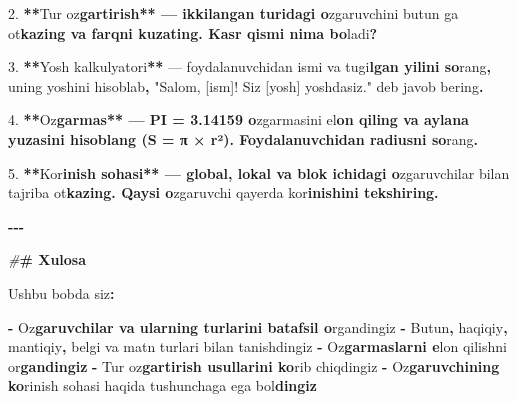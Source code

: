 \documentclass[a4paper,11pt,twoside,openright]{book}
\newenvironment{Shaded}{\begin{snugshade}}{\end{snugshade}}
\newcommand{\CharTok}[1]{\textcolor[rgb]{0.31,0.60,0.02}{#1}}
\newcommand{\ErrorTok}[1]{\textcolor[rgb]{0.64,0.00,0.00}{\textbf{#1}}}
\newcommand{\FloatTok}[1]{\textcolor[rgb]{0.00,0.00,0.81}{#1}}
\newcommand{\NormalTok}[1]{#1}
\newcommand{\OperatorTok}[1]{\textcolor[rgb]{0.81,0.36,0.00}{\textbf{#1}}}
\newcommand{\PreprocessorTok}[1]{\textcolor[rgb]{0.56,0.35,0.01}{\textit{#1}}}
\newcommand{\StringTok}[1]{\textcolor[rgb]{0.31,0.60,0.02}{#1}}
\begin{document}
\begin{Shaded}
\begin{Highlighting}[]
\FloatTok{2.} \OperatorTok{**}\NormalTok{Tur o}\CharTok{\textquotesingle{}z}\ErrorTok{gartirish** — \textasciigrave{}ikkilangan\textasciigrave{} turidagi o}\CharTok{\textquotesingle{}}\NormalTok{zgaruvchini }\ErrorTok{\textasciigrave{}}\NormalTok{butun}\ErrorTok{\textasciigrave{}}\NormalTok{ ga o}\CharTok{\textquotesingle{}t}\ErrorTok{kazing va farqni kuzating. Kasr qismi nima bo}\CharTok{\textquotesingle{}}\NormalTok{ladi}\OperatorTok{?}

\FloatTok{3.} \OperatorTok{**}\NormalTok{Yosh kalkulyatori}\OperatorTok{**}\NormalTok{ — foydalanuvchidan ismi va tug}\CharTok{\textquotesingle{}i}\ErrorTok{lgan yilini so}\CharTok{\textquotesingle{}}\NormalTok{rang}\OperatorTok{,}\NormalTok{ uning yoshini hisoblab}\OperatorTok{,} \StringTok{"Salom, [ism]! Siz [yosh] yoshdasiz."}\NormalTok{ deb javob bering}\OperatorTok{.}

\FloatTok{4.} \OperatorTok{**}\NormalTok{O}\CharTok{\textquotesingle{}z}\ErrorTok{garmas** — \textasciigrave{}PI = 3.14159\textasciigrave{} o}\CharTok{\textquotesingle{}}\NormalTok{zgarmasini e}\CharTok{\textquotesingle{}l}\ErrorTok{on qiling va aylana yuzasini hisoblang (\textasciigrave{}S = π × r²\textasciigrave{}). Foydalanuvchidan radiusni so}\CharTok{\textquotesingle{}}\NormalTok{rang}\OperatorTok{.}

\FloatTok{5.} \OperatorTok{**}\NormalTok{Ko}\CharTok{\textquotesingle{}r}\ErrorTok{inish sohasi** — global, lokal va blok ichidagi o}\CharTok{\textquotesingle{}}\NormalTok{zgaruvchilar bilan tajriba o}\CharTok{\textquotesingle{}t}\ErrorTok{kazing. Qaysi o}\CharTok{\textquotesingle{}}\NormalTok{zgaruvchi qayerda ko}\CharTok{\textquotesingle{}r}\ErrorTok{inishini tekshiring.}

\OperatorTok{{-}{-}{-}}

\PreprocessorTok{\#}\ErrorTok{\# Xulosa}

\NormalTok{Ushbu bobda siz}\OperatorTok{:}

\OperatorTok{{-}}\NormalTok{ O}\CharTok{\textquotesingle{}z}\ErrorTok{garuvchilar va ularning turlarini batafsil o}\CharTok{\textquotesingle{}}\NormalTok{rgandingiz}
\OperatorTok{{-}}\NormalTok{ Butun}\OperatorTok{,}\NormalTok{ haqiqiy}\OperatorTok{,}\NormalTok{ mantiqiy}\OperatorTok{,}\NormalTok{ belgi va matn turlari bilan tanishdingiz}
\OperatorTok{{-}}\NormalTok{ O}\CharTok{\textquotesingle{}z}\ErrorTok{garmaslarni e}\CharTok{\textquotesingle{}}\NormalTok{lon qilishni o}\CharTok{\textquotesingle{}r}\ErrorTok{gandingiz}
\OperatorTok{{-}}\NormalTok{ Tur o}\CharTok{\textquotesingle{}z}\ErrorTok{gartirish usullarini ko}\CharTok{\textquotesingle{}}\NormalTok{rib chiqdingiz}
\OperatorTok{{-}}\NormalTok{ O}\CharTok{\textquotesingle{}z}\ErrorTok{garuvchining ko}\CharTok{\textquotesingle{}}\NormalTok{rinish sohasi haqida tushunchaga ega bo}\CharTok{\textquotesingle{}l}\ErrorTok{dingiz}


\end{Highlighting}
\end{Shaded}
\end{document}
